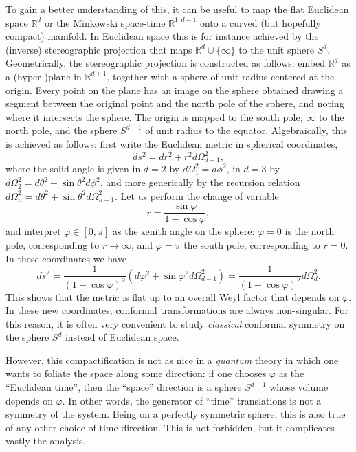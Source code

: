 \documentclass[a4paper,12pt]{article}
\numberwithin{equation}{section}
\begin{document}
To gain a better understanding of this, it can be useful to map the flat Euclidean space $\mathds{R}^d$ or the Minkowski space-time $\mathds{R}^{1,d-1}$ onto a curved (but hopefully compact) manifold.
In Euclidean space this is for instance achieved by the (inverse) stereographic projection that maps $\mathds{R}^d \cup \{ \infty \}$ to the unit sphere $S^d$.
Geometrically, the stereographic projection is constructed as follows: embed $\mathds{R}^d$ as a (hyper-)plane in $\mathds{R}^{d+1}$, together with a sphere of unit radius centered at the origin. Every point on the plane has an image on the sphere obtained drawing a segment between the original point and the north pole of the sphere, and noting where it intersects the sphere. The origin is mapped to the south pole, $\infty$ to the north pole, and the sphere $S^{d-1}$ of unit radius to the equator.
Algebraically, this is achieved as follows: first write the Euclidean metric in spherical coordinates,
\begin{equation}
	ds^2 = dr^2 + r^2 d\Omega_{d-1}^2,
\end{equation}
where the solid angle is given in $d = 2$ by $d\Omega_1^2 = d\phi^2$, in $d = 3$ by $d\Omega_2^2 = d\theta^2 + \sin\theta^2 d\phi^2$, and more generically by the recursion relation $d\Omega_n^2 = d\theta^2 + \sin\theta^2 d\Omega_{n-1}^2$.
Let us perform the change of variable
\begin{equation}
	r = \frac{\sin\varphi}{1 - \cos\varphi},
\end{equation}
and interpret $\varphi \in [0, \pi]$ as the zenith angle on the sphere:
$\varphi = 0$ is the north pole, corresponding to $r \to \infty$, and $\varphi = \pi$ the south pole, corresponding to $r = 0$. In these coordinates we have
\begin{equation}
	ds^2 = \frac{1}{(1 - \cos\varphi)^2}
	\left( d\varphi^2 + \sin\varphi^2 d\Omega_{d-1}^2 \right)
	= \frac{1}{(1 - \cos\varphi)^2} d\Omega_d^2.
\end{equation}
This shows that the metric is flat up to an overall Weyl factor that depends on $\varphi$.
In these new coordinates, conformal transformations are always non-singular. 
For this reason, it is often very convenient to study \emph{classical} conformal symmetry on the sphere $S^d$ instead of Euclidean space.

However, this compactification is not as nice in a \emph{quantum} theory in which one wants to foliate the space along some direction: if one chooses $\varphi$ as the ``Euclidean time'', then the ``space'' direction is a sphere $S^{d-1}$ whose volume depends on $\varphi$. In other words, the generator of ``time'' translations is not a symmetry of the system. Being on a perfectly symmetric sphere, this is also true of any other choice of time direction.
This is not forbidden, but it complicates vastly the analysis.
\end{document}

